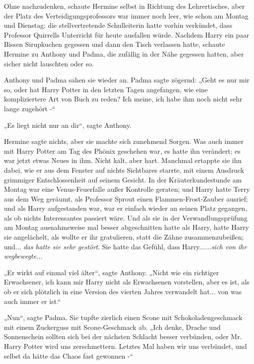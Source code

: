 {Ohne nachzudenken, schaute Hermine selbst in Richtung des Lehrertisches, aber der Platz des Verteidigungsprofessors war immer noch leer, wie schon am Montag und Dienstag; die stellvertretende Schulleiterin hatte vorhin verkündet, dass Professor Quirrells Unterricht für heute ausfallen würde. Nachdem Harry ein paar Bissen Sirupkuchen gegessen und dann den Tisch verlassen hatte, schaute Hermine zu Anthony und Padma, die zufällig in der Nähe gegessen hatten, aber sicher nicht lauschten oder so.

Anthony und Padma sahen sie wieder an. Padma sagte zögernd: „Geht es nur mir so, oder hat Harry Potter in den letzten Tagen angefangen, wie eine kompliziertere Art von Buch zu reden? Ich meine, ich habe ihm noch nicht sehr lange zugehört -“

„Es liegt nicht nur an dir“, sagte Anthony.

Hermine sagte nichts, aber sie machte sich zunehmend Sorgen. Was auch immer mit Harry Potter am Tag des Phönix geschehen war, es hatte ihn verändert; es war jetzt etwas Neues in ihm. Nicht kalt, aber hart. Manchmal ertappte sie ihn dabei, wie er aus dem Fenster auf nichts Sichtbares starrte, mit einem Ausdruck grimmiger Entschlossenheit auf seinem Gesicht. In der Kräuterkundestunde am Montag war eine Venus-Feuerfalle außer Kontrolle geraten; und Harry hatte Terry aus dem Weg geräumt, als Professor Sprout einen Flammen-Frost-Zauber ausrief; und als Harry aufgestanden war, war er einfach wieder an seinen Platz gegangen, als ob nichts Interessantes passiert wäre. Und als sie in der Verwandlungsprüfung am Montag ausnahmsweise mal besser abgeschnitten hatte als Harry, hatte Harry sie angelächelt, als wollte er ihr gratulieren, statt die Zähne zusammenzubeißen; und... \emph{das hatte sie sehr gestört}. Sie hatte das Gefühl, dass Harry...\emph{...sich von ihr wegbewegte...}

„Er wirkt auf einmal viel älter“, sagte Anthony. „Nicht wie ein richtiger Erwachsener, ich kann mir Harry nicht als Erwachsenen vorstellen, aber es ist, als ob er sich plötzlich in eine Version des vierten Jahres verwandelt hat... von was auch immer er ist.“

„Nun“, sagte Padma. Sie tupfte zierlich einen Scone mit Schokoladengeschmack mit einem Zuckerguss mit Scone-Geschmack ab. „Ich denke, Drache und Sonnenschein sollten sich bei der nächsten Schlacht besser verbünden, oder Mr. Harry Potter wird uns zerschmettern. Letztes Mal haben wir uns verbündet, und selbst da hätte das Chaos fast gewonnen -“

}

